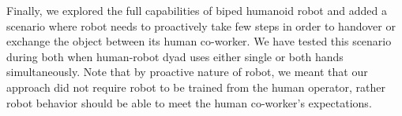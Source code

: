 Finally, we explored the full capabilities of biped humanoid robot and added a scenario where robot needs to proactively take few steps in order to handover or exchange the object between its human co-worker. We have tested this scenario during both when human-robot dyad uses either single or both hands simultaneously. Note that by proactive nature of robot, we meant that our approach did not require robot to be trained from the human operator, rather robot behavior should be able to meet the human co-worker's expectations.


\clearpage %



%



%
